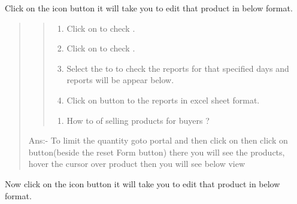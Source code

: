 \documentclass[a4paper,10pt,english]{report}
\begin{document}
Click on the  icon button it will take you to edit that product in below format.
\begin{quote}
\begin{quote}
\begin{enumerate}
\def\theenumi{\arabic{enumi}}
\def\labelenumi{\theenumi .}
\makeatletter\def\p@enumii{\p@enumi \theenumi .}\makeatother
\item {} 
Click on  to check  .

\item {} 
Click on  to check  .

\item {} 
Select the  to  to check the reports for that specified days and reports will be appear below.

\item {} 
Click on  button to  the reports in excel sheet format.

\end{enumerate}
\begin{enumerate}
\def\theenumi{\arabic{enumi}}
\def\labelenumi{\theenumi .}
\makeatletter\def\p@enumii{\p@enumi \theenumi .}\makeatother
\setcounter{enumi}{13}
\item {} 
How to  of selling products for buyers ?

\end{enumerate}
\end{quote}

Ans:- To limit the quantity goto  portal and then click on  then click on  button(beside the reset Form button) there you will see the products, hover the cursor over product then you will see below view
\end{quote}

\begin{figure}[htbp]
\centering

\noindent{}
\end{figure}

Now click on the  icon button it will take you to edit that product in below format.

\begin{figure}[htbp]
\centering

\noindent{}
\end{figure}
\end{document}
